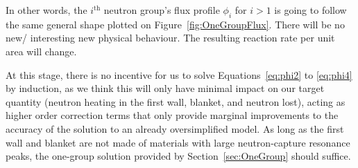 \documentclass[a4paper, 12pt]{article}
\begin{document}
In other words, the $i^{\text{th}}$ neutron group's flux profile $\phi_i$ for $i>1$ is going to follow the same general shape plotted on Figure~\ref{fig:OneGroupFlux}. There will be no new/ interesting new physical behaviour. The resulting reaction rate per unit area will change.

At this stage, there is no incentive for us to solve Equations~\ref{eq:phi2} to \ref{eq:phi4} by induction, as we think this will only have minimal impact on our target quantity (neutron heating in the first wall, blanket, and neutron lost), acting as higher order correction terms that only provide marginal improvements to the accuracy of the solution to an already oversimplified model. As long as the first wall and blanket are not made of materials with large neutron-capture resonance peaks, the one-group solution provided by Section~\ref{sec:OneGroup} should suffice.



\end{document}
